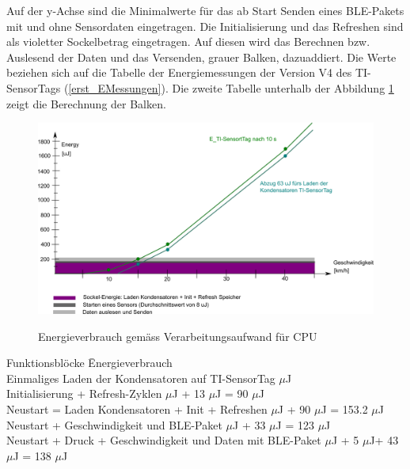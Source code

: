 Auf der y-Achse sind die Minimalwerte für das ab Start Senden eines BLE-Pakets mit und ohne Sensordaten eingetragen. Die Initialisierung und das Refreshen sind als violetter Sockelbetrag eingetragen. Auf diesen wird das Berechnen bzw. Auslesend der Daten und das Versenden, grauer Balken, dazuaddiert. Die Werte beziehen sich auf die Tabelle der Energiemessungen der Version V4 des TI-SensorTags (\ref{erst_EMessungen}). Die zweite Tabelle unterhalb der Abbildung \ref{r_bild_e_zusammenfassung} zeigt die Berechnung der Balken.

\begin{figure}[ht]
     \includegraphics[width=1\textwidth]{4Resultate/imag/EnergyVerbrauchZusammenfassung.png}\label{resultat_Zsm_Energy} 
     \caption{Energieverbrauch gem\"{a}ss Verarbeitungsaufwand für CPU}
     \label{r_bild_e_zusammenfassung}
\end{figure}

\begin{minipage}{\textwidth}
    \begin{tabbing}
    Funktionsblöcke \quad\= Energieverbrauch \\[0.8ex]
    Einmaliges Laden der Kondensatoren auf TI-SensorTag         $\mu$J\\
    Initialisierung + Refresh-Zyklen                            $\mu$J + 13 $\mu$J = 90 $\mu$J\\
    Neustart = Laden Kondensatoren + Init + Refreshen           $\mu$J + 90 $\mu$J = 153.2 $\mu$J\\
    Neustart + Geschwindigkeit und BLE-Paket                    $\mu$J + 33 $\mu$J = 123 $\mu$J\\
    Neustart + Druck + Geschwindigkeit und Daten mit BLE-Paket  $\mu$J + 5 $\mu$J+ 43 $\mu$J = 138 $\mu$J\\
    \end{tabbing}
\end{minipage}


